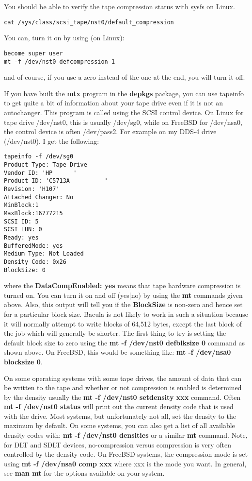 You should be able to verify the tape compression status with sysfs on Linux.
\begin{verbatim}
cat /sys/class/scsi_tape/nst0/default_compression
\end{verbatim}

You can, turn it on by using (on Linux):

\footnotesize
\begin{verbatim}
become super user
mt -f /dev/nst0 defcompression 1
\end{verbatim}
\normalsize

and of course, if you use a zero instead of the one at the end, you will turn
it off.

If you have built the {\bf mtx} program in the {\bf depkgs} package, you can
use tapeinfo to get quite a bit of information about your tape drive even if
it is not an autochanger. This program is called using the SCSI control
device. On Linux for tape drive /dev/nst0, this is usually /dev/sg0, while on
FreeBSD for /dev/nsa0, the control device is often /dev/pass2. For example on
my DDS-4 drive (/dev/nst0), I get the following:

\footnotesize
\begin{verbatim}
tapeinfo -f /dev/sg0
Product Type: Tape Drive
Vendor ID: 'HP      '
Product ID: 'C5713A          '
Revision: 'H107'
Attached Changer: No
MinBlock:1
MaxBlock:16777215
SCSI ID: 5
SCSI LUN: 0
Ready: yes
BufferedMode: yes
Medium Type: Not Loaded
Density Code: 0x26
BlockSize: 0
\end{verbatim}
\normalsize

where the {\bf DataCompEnabled: yes} means that tape hardware compression is
turned on. You can turn it on and off (yes|no) by using the {\bf mt}
commands given above. Also, this output will tell you if the {\bf BlockSize}
is non-zero and hence set for a particular block size. Bacula is not likely to
work in such a situation because it will normally attempt to write blocks of
64,512 bytes, except the last block of the job which will generally be
shorter. The first thing to try is setting the default block size to zero
using the {\bf mt -f /dev/nst0 defblksize 0} command as shown above.
On FreeBSD, this would be something like: {\bf mt -f /dev/nsa0 blocksize 0}.

On some operating systems with some tape drives, the amount of data that
can be written to the tape and whether or not compression is enabled is
determined by the density usually the {\bf mt -f /dev/nst0 setdensity xxx} command.
Often  {\bf mt -f /dev/nst0 status} will print out the current
density code that is used with the drive.  Most systems, but unfortunately
not all, set the density to the maximum by default. On some systems, you
can also get a list of all available density codes with:
{\bf mt -f /dev/nst0 densities} or a similar {\bf mt} command.
Note, for DLT and SDLT devices, no-compression versus compression is very
often controlled by the density code.  On FreeBSD systems, the compression
mode is set using {\bf mt -f /dev/nsa0 comp xxx} where xxx is the
mode you want.  In general, see {\bf man mt}  for the options available on
your system.

